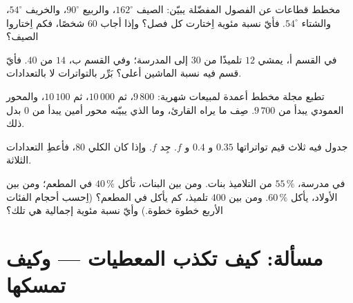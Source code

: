 \begin{exercise}[$\star$]\label{exo:g7:stats:7}
مخطط قطاعات عن الفصول المفضّلة يبيّن: الصيف $162^\circ$، والربيع
$90^\circ$، والخريف $54^\circ$، والشتاء $54^\circ$. فأيّ نسبة مئوية
اِختارت كل فصل؟ وإذا أجاب $60$ شخصًا، فكم اِختاروا الصيف؟
\end{exercise}

\begin{exercise}[$\star\star$]\label{exo:g7:stats:8}
في القسم أ، يمشي $12$ تلميذًا من $30$ إلى المدرسة؛ وفي القسم ب،
$14$ من $40$. فأيّ قسم فيه نسبة الماشين أعلى؟
بَرِّر بالتواترات لا بالتعدادات.
\end{exercise}

\begin{exercise}[$\star\star$]\label{exo:g7:stats:9}
تطبع مجلة مخطط أعمدة لمبيعات شهرية: $9\,800$، ثم
$10\,000$، ثم $10\,100$، والمحور العمودي يبدأ من
$9\,700$. صِف ما يراه القارئ، وما الذي يبيّنه محور أمين
يبدأ من $0$ بدل ذلك.
\end{exercise}

\begin{exercise}[$\star\star$]\label{exo:g7:stats:10}
جدول  فيه ثلاث قيم تواتراتها $0.35$ و $0.4$ و
$f$. جِد $f$. وإذا كان  الكلي $80$، فأعطِ التعدادات الثلاثة.
\end{exercise}

\begin{exercise}[$\star\star\star$]\label{exo:g7:stats:11}
في مدرسة، $55\,\%$ من التلاميذ بنات. ومن بين البنات،
تأكل $40\,\%$ في المطعم؛ ومن بين الأولاد، يأكل $60\,\%$. ومن بين
$400$ تلميذ، كم يأكل في المطعم؟ (اِحسب أحجام الفئات
الأربع خطوة خطوة.) وأيّ نسبة مئوية إجمالية هي تلك؟
\end{exercise}

\section{مسألة: كيف تكذب المعطيات --- وكيف تمسكها}

